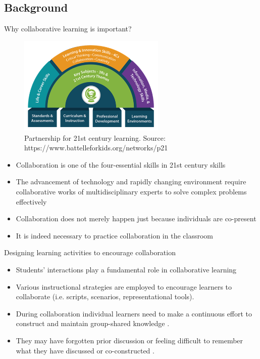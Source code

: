 \subsection{Background}
\begin{frame}[allowframebreaks]{Why collaborative learning is important?}

    \begin{figure}[tb]
        \begin{center}
            \includegraphics[width=70mm]{images/p21centuryskills.png}
        \end{center}
        \caption{Partnership for 21st century learning. Source: https://www.battelleforkids.org/networks/p21}
        \label{intro::p21}
    \end{figure}

    \begin{itemize}
        \item Collaboration is one of the four-essential skills in 21st century skills
        \item The advancement of technology and rapidly changing environment require 
        collaborative works of multidisciplinary experts to solve complex problems effectively
        \item Collaboration does not merely happen just because individuals are co-present
        \item It is indeed necessary to practice collaboration in the classroom
    \end{itemize}
\end{frame}

\begin{frame}[allowframebreaks]{Designing learning activities to encourage collaboration}
    \begin{itemize}
        \item Students' interactions play a fundamental role in collaborative learning 
        \cite{Baines2009ImprovingStudy,Webb2009TheClassroom}
        \item Various instructional strategies are employed to encourage learners to collaborate 
        (i.e. scripts, scenarios, representational tools).
        \item During collaboration individual learners need to make a continuous effort 
        to construct and maintain group-shared knowledge \cite{Roschelle1995TheSolving}. 
        \item They may have forgotten prior discussion or feeling difficult to remember 
        what they have discussed or co-constructed \cite{Jeong2016SevenHelp}.
    \end{itemize}
\end{frame}

